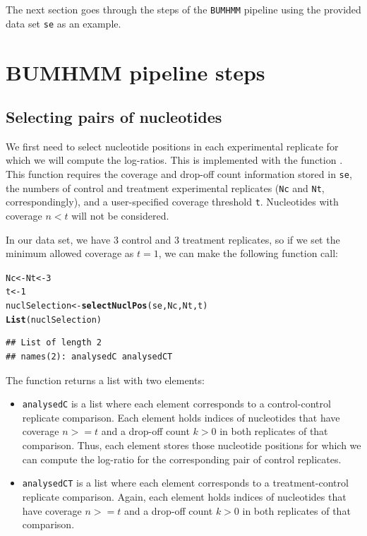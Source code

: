 \documentclass{article}\usepackage[]{graphicx}\usepackage[usenames,dvipsnames]{color}
\makeatletter
\newcommand{\hlnum}[1]{\textcolor[rgb]{0.686,0.059,0.569}{#1}}%
\newcommand{\hlstd}[1]{\textcolor[rgb]{0.345,0.345,0.345}{#1}}%
\newcommand{\hlkwb}[1]{\textcolor[rgb]{0.69,0.353,0.396}{#1}}%
\newcommand{\hlkwd}[1]{\textcolor[rgb]{0.737,0.353,0.396}{\textbf{#1}}}%
\newenvironment{kframe}{%
 \def\at@end@of@kframe{}%
 \ifinner\ifhmode%
  \def\at@end@of@kframe{\end{minipage}}%
  \begin{minipage}{\columnwidth}%
 \fi\fi%
 \def\FrameCommand##1{\hskip\@totalleftmargin \hskip-\fboxsep
 \colorbox{shadecolor}{##1}\hskip-\fboxsep
     \hskip-\linewidth \hskip-\@totalleftmargin \hskip\columnwidth}%
 \MakeFramed {\advance\hsize-\width
   \@totalleftmargin\z@ \linewidth\hsize
   \@setminipage}}%
 {\par\unskip\endMakeFramed%
 \at@end@of@kframe}
\newenvironment{knitrout}{}{} %
\makeatother
\begin{document}
The next section goes through the steps of the \verb|BUMHMM| pipeline using the
provided data set \texttt{se} as an example.

\section{BUMHMM pipeline steps}

\subsection{Selecting pairs of nucleotides}

We first need to select nucleotide positions in each experimental replicate for
which we will compute the log-ratios. This is implemented with the function
. This function requires the coverage and drop-off
count information stored in \texttt{se}, the numbers of control and treatment
experimental replicates (\texttt{Nc} and \texttt{Nt}, correspondingly), and a
user-specified coverage threshold \texttt{t}. Nucleotides with coverage $n < t$
will not be considered.

In our data set, we have 3 control and 3 treatment replicates, so if we set the
minimum allowed coverage as $t = 1$, we can make the following function call:

\begin{knitrout}
\color{fgcolor}\begin{kframe}
\begin{alltt}
\hlstd{Nc} \hlkwb{<-} \hlstd{Nt} \hlkwb{<-} \hlnum{3}
\hlstd{t} \hlkwb{<-} \hlnum{1}
\hlstd{nuclSelection} \hlkwb{<-} \hlkwd{selectNuclPos}\hlstd{(se, Nc, Nt, t)}
\hlkwd{List}\hlstd{(nuclSelection)}
\end{alltt}
\begin{verbatim}
## List of length 2
## names(2): analysedC analysedCT
\end{verbatim}
\end{kframe}
\end{knitrout}

The function  returns a list with two elements:

\begin{itemize}

  \item \texttt{analysedC} is a list where each element corresponds to a
  control-control replicate comparison. Each element holds indices of
  nucleotides that have coverage $n >= t$ and a drop-off count $k > 0$ in both
  replicates of that comparison. Thus, each element stores those nucleotide
  positions for which we can compute the log-ratio for the corresponding pair of
  control replicates.

  \item \texttt{analysedCT} is a list where each element corresponds to a
  treatment-control replicate comparison. Again, each element holds indices of
  nucleotides that have coverage $n >= t$ and a drop-off count $k > 0$ in both
  replicates of that comparison.

\end{itemize}
\end{document}
